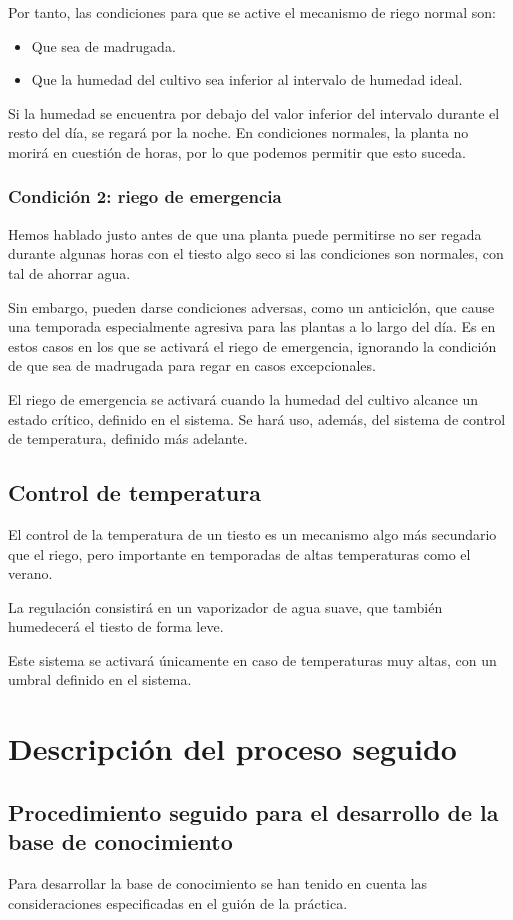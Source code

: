 \documentclass[11pt,a4paper]{article}
\begin{document}
Por tanto, las condiciones para que se active el mecanismo de riego normal son:
\begin{itemize}
\item Que sea de madrugada.
\item Que la humedad del cultivo sea inferior al intervalo de humedad ideal.
\end{itemize}

Si la humedad se encuentra por debajo del valor inferior del intervalo durante el resto del día, se regará por la noche. En condiciones normales, la planta no morirá en cuestión de horas, por lo que podemos permitir que esto suceda.

\subsubsection*{Condición 2: riego de emergencia}
Hemos hablado justo antes de que una planta puede permitirse no ser regada durante algunas horas con el tiesto algo seco si las condiciones son normales, con tal de ahorrar agua. 

Sin embargo, pueden darse condiciones adversas, como un anticiclón, que cause una temporada especialmente agresiva para las plantas a lo largo del día. Es en estos casos en los que se activará el riego de emergencia, ignorando la condición de que sea de madrugada para regar en casos excepcionales.

El riego de emergencia se activará cuando la humedad del cultivo alcance un estado crítico, definido en el sistema. Se hará uso, además, del sistema de control de temperatura, definido más adelante.

\subsection{Control de temperatura}
El control de la temperatura de un tiesto es un mecanismo algo más secundario que el riego, pero importante en temporadas de altas temperaturas como el verano.

La regulación consistirá en un vaporizador de agua suave, que también humedecerá el tiesto de forma leve.

Este sistema se activará únicamente en caso de temperaturas muy altas, con un umbral definido en el sistema. 


\section{Descripción del proceso seguido}
\subsection{Procedimiento seguido para el desarrollo de la base de conocimiento}
Para desarrollar la base de conocimiento se han tenido en cuenta las consideraciones especificadas en el guión de la práctica.
\end{document}
